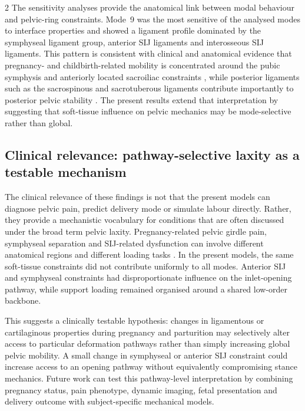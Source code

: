 \documentclass[openacc]{rsproca_new}
\begin{document}
\begin{multicols}{2}
The sensitivity analyses provide the anatomical link between modal behaviour and pelvic-ring constraints. Mode~9 was the most sensitive of the analysed modes to interface properties and showed a ligament profile dominated by the symphyseal ligament group, anterior SIJ ligaments and interosseous SIJ ligaments. This pattern is consistent with clinical and anatomical evidence that pregnancy- and childbirth-related mobility is concentrated around the pubic symphysis and anteriorly located sacroiliac constraints \cite{Damen2001,Pires2015,Cicek2015,Fiani2021}, while posterior ligaments such as the sacrospinous and sacrotuberous ligaments contribute importantly to posterior pelvic stability \cite{Hammer2019,Aldabe2019}. The present results extend that interpretation by suggesting that soft-tissue influence on pelvic mechanics may be mode-selective rather than global.

\subsection{Clinical relevance: pathway-selective laxity as a testable mechanism}

The clinical relevance of these findings is not that the present models can diagnose pelvic pain, predict delivery mode or simulate labour directly. Rather, they provide a mechanistic vocabulary for conditions that are often discussed under the broad term pelvic laxity. Pregnancy-related pelvic girdle pain, symphyseal separation and SIJ-related dysfunction can involve different anatomical regions and different loading tasks \cite{Damen2001,Vleeming2012,Kiapour2019,Stolarczyk2021}. In the present models, the same soft-tissue constraints did not contribute uniformly to all modes. Anterior SIJ and symphyseal constraints had disproportionate influence on the inlet-opening pathway, while support loading remained organised around a shared low-order backbone.

This suggests a clinically testable hypothesis: changes in ligamentous or cartilaginous properties during pregnancy and parturition may selectively alter access to particular deformation pathways rather than simply increasing global pelvic mobility. A small change in symphyseal or anterior SIJ constraint could increase access to an opening pathway without equivalently compromising stance mechanics. Future work can test this pathway-level interpretation by combining pregnancy status, pain phenotype, dynamic imaging, fetal presentation and delivery outcome with subject-specific mechanical models.


\end{multicols}
\end{document}
